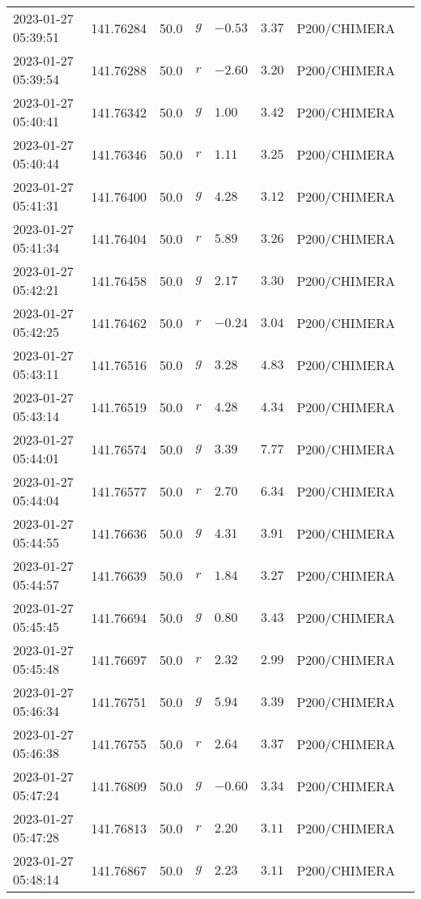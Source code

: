\documentclass{nature_plusfigure}
\begin{document}
\begin{supplement}
\begin{center}
\begin{longtable}{llllllll}
2023-01-27 05:39:51 & 141.76284 & 50.0 & $g$ & $-0.53$ & $3.37$ & P200/CHIMERA &  \\ 
2023-01-27 05:39:54 & 141.76288 & 50.0 & $r$ & $-2.60$ & $3.20$ & P200/CHIMERA &  \\ 
2023-01-27 05:40:41 & 141.76342 & 50.0 & $g$ & $1.00$ & $3.42$ & P200/CHIMERA &  \\ 
2023-01-27 05:40:44 & 141.76346 & 50.0 & $r$ & $1.11$ & $3.25$ & P200/CHIMERA &  \\ 
2023-01-27 05:41:31 & 141.76400 & 50.0 & $g$ & $4.28$ & $3.12$ & P200/CHIMERA &  \\ 
2023-01-27 05:41:34 & 141.76404 & 50.0 & $r$ & $5.89$ & $3.26$ & P200/CHIMERA &  \\ 
2023-01-27 05:42:21 & 141.76458 & 50.0 & $g$ & $2.17$ & $3.30$ & P200/CHIMERA &  \\ 
2023-01-27 05:42:25 & 141.76462 & 50.0 & $r$ & $-0.24$ & $3.04$ & P200/CHIMERA &  \\ 
2023-01-27 05:43:11 & 141.76516 & 50.0 & $g$ & $3.28$ & $4.83$ & P200/CHIMERA &  \\ 
2023-01-27 05:43:14 & 141.76519 & 50.0 & $r$ & $4.28$ & $4.34$ & P200/CHIMERA &  \\ 
2023-01-27 05:44:01 & 141.76574 & 50.0 & $g$ & $3.39$ & $7.77$ & P200/CHIMERA &  \\ 
2023-01-27 05:44:04 & 141.76577 & 50.0 & $r$ & $2.70$ & $6.34$ & P200/CHIMERA &  \\ 
2023-01-27 05:44:55 & 141.76636 & 50.0 & $g$ & $4.31$ & $3.91$ & P200/CHIMERA &  \\ 
2023-01-27 05:44:57 & 141.76639 & 50.0 & $r$ & $1.84$ & $3.27$ & P200/CHIMERA &  \\ 
2023-01-27 05:45:45 & 141.76694 & 50.0 & $g$ & $0.80$ & $3.43$ & P200/CHIMERA &  \\ 
2023-01-27 05:45:48 & 141.76697 & 50.0 & $r$ & $2.32$ & $2.99$ & P200/CHIMERA &  \\ 
2023-01-27 05:46:34 & 141.76751 & 50.0 & $g$ & $5.94$ & $3.39$ & P200/CHIMERA &  \\ 
2023-01-27 05:46:38 & 141.76755 & 50.0 & $r$ & $2.64$ & $3.37$ & P200/CHIMERA &  \\ 
2023-01-27 05:47:24 & 141.76809 & 50.0 & $g$ & $-0.60$ & $3.34$ & P200/CHIMERA &  \\ 
2023-01-27 05:47:28 & 141.76813 & 50.0 & $r$ & $2.20$ & $3.11$ & P200/CHIMERA &  \\ 
2023-01-27 05:48:14 & 141.76867 & 50.0 & $g$ & $2.23$ & $3.11$ & P200/CHIMERA &  \\ 

\end{longtable}
\end{center}
\end{supplement}
\end{document}
